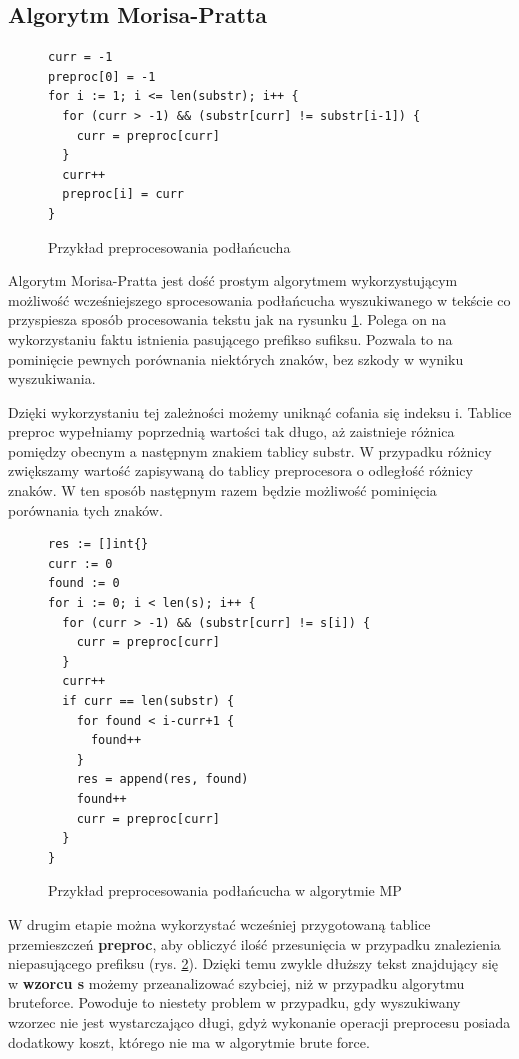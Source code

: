 \subsection{Algorytm Morisa-Pratta}

\begin{figure}[h]
  \centering
  \begin{lstlisting}
curr = -1
preproc[0] = -1
for i := 1; i <= len(substr); i++ {
  for (curr > -1) && (substr[curr] != substr[i-1]) {
    curr = preproc[curr]
  }
  curr++
  preproc[i] = curr
}
  \end{lstlisting}
  \caption{Przykład preprocesowania podłańcucha}
  \label{fig:code:preprocessMorisPratt}
\end{figure}

Algorytm Morisa-Pratta jest dość prostym algorytmem wykorzystującym możliwość
wcześniejszego sprocesowania podłańcucha wyszukiwanego w tekście co przyspiesza
sposób procesowania tekstu jak na rysunku \ref{fig:code:preprocessMorisPratt}.
Polega on na wykorzystaniu faktu istnienia pasującego prefikso sufiksu.
Pozwala to na pominięcie pewnych porównania niektórych znaków, bez szkody w
wyniku wyszukiwania.

Dzięki wykorzystaniu tej zależności możemy uniknąć cofania się indeksu i. 
Tablice preproc wypełniamy poprzednią wartości tak długo, aż zaistnieje różnica 
pomiędzy obecnym a następnym znakiem tablicy substr. W przypadku różnicy 
zwiększamy wartość zapisywaną do tablicy preprocesora o odległość różnicy znaków.
W ten sposób następnym razem będzie możliwość pominięcia porównania tych znaków.

\begin{figure}[h]
  \centering
  \begin{lstlisting}
res := []int{}
curr := 0
found := 0
for i := 0; i < len(s); i++ {
  for (curr > -1) && (substr[curr] != s[i]) {
    curr = preproc[curr]
  }
  curr++
  if curr == len(substr) {
    for found < i-curr+1 {
      found++
    }
    res = append(res, found)
    found++
    curr = preproc[curr]
  }
}
  \end{lstlisting}
  \caption{Przykład preprocesowania podłańcucha w algorytmie MP}
  \label{fig:code:algoMorisPratt}
\end{figure}

W drugim etapie można wykorzystać wcześniej przygotowaną tablice przemieszczeń 
\textbf{preproc}, aby obliczyć ilość przesunięcia w przypadku znalezienia 
niepasującego prefiksu (rys. \ref{fig:code:algoMorisPratt}). Dzięki temu zwykle dłuższy tekst znajdujący się w 
\textbf{wzorcu s} możemy przeanalizować szybciej, niż w przypadku algorytmu 
bruteforce. Powoduje to niestety problem w przypadku, gdy wyszukiwany wzorzec
nie jest wystarczająco długi, gdyż wykonanie operacji preprocesu posiada 
dodatkowy koszt, którego nie ma w algorytmie brute force.


